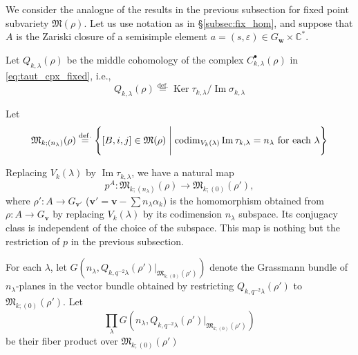 \documentclass[12pt]{amsart}
\def\Bbb{\mathbb}
\def\frak{\mathfrak}
\theoremstyle{definition}
\theoremstyle{remark}
\numberwithin{equation}{subsection}
\newcommand{\subsecref}[1]{\S\ref{#1}}
\newcommand{\defeq}{\overset{\operatorname{\scriptstyle def.}}{=}}
\newcommand{\C}{{\Bbb C}}
\newcommand{\Ker}{\operatorname{Ker}}
\newcommand{\Ima}{\operatorname{Im}}
\newcommand{\vin}{\operatorname{in}} %
\newcommand{\M}{{\frak M}} %
\newcommand{\bv}{{\mathbf v}} %
\newcommand{\bw}{{\mathbf w}} %
\newcommand{\codim}{\operatorname{codim}} %
\begin{document}
We consider the analogue of the results in the previous subsection for 
fixed point subvariety $\M(\rho)$. Let us use notation as in
\subsecref{subsec:fix_hom}, and suppose that $A$ is the Zariski
closure of a semisimple element $a = (s,\varepsilon)\in G_\bw\times\C^*$.

Let $Q_{k,\lambda}(\rho)$ be the middle cohomology of the
complex $C_{k,\lambda}^\bullet(\rho)$ in \eqref{eq:taut_cpx_fixed}, i.e.,
\begin{equation*}
   Q_{k,\lambda}(\rho) \defeq
   \Ker\tau_{k,\lambda}/\Ima\sigma_{k,\lambda}
\end{equation*}

Let
\begin{equation}\label{eq:fix_subset}
        \M_{k;(n_\lambda)}(\rho) \defeq
        \left\{ [B,i,j]\in \M(\rho) \Biggm| \text{$\codim_{V_k(\lambda)}
        \Ima \tau_{k,\lambda}
        = n_\lambda$ for each $\lambda$}\right\}
\end{equation}

Replacing $V_k(\lambda)$ by $\Ima\tau_{k,\lambda}$, we have a natural
map
\begin{equation*}
   p^A \colon \M_{k;(n_\lambda)}(\rho) \to \M_{k;(0)}(\rho'),
\end{equation*}
where $\rho'\colon A\to G_{\bv'}$ ($\bv' = {\bv - \sum n_\lambda
\alpha_k}$) is the homomorphism obtained from $\rho\colon A\to G_\bv$
by replacing $V_k(\lambda)$ by its codimension $n_\lambda$
subspace. Its conjugacy class is independent of the choice of the
subspace. This map is nothing but the restriction of $p$ in the
previous subsection.

For each $\lambda$,
let $G(n_\lambda,Q_{k,q^{-2}\lambda}(\rho')|_{\M_{k;(0)}(\rho')})$
denote the Grassmann bundle of $n_\lambda$-planes in the vector bundle
obtained by restricting $Q_{k,q^{-2}\lambda}(\rho')$ to
$\M_{k;(0)}(\rho')$.
%
Let 
\begin{equation*}
   \prod_\lambda G(n_\lambda,Q_{k,q^{-2}\lambda}(\rho')|_{\M_{k;(0)}(\rho')})
\end{equation*}
be their fiber product over $\M_{k;(0)}(\rho')$
\end{document}
